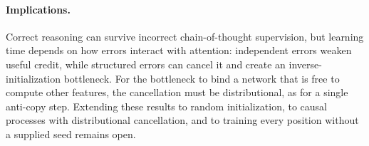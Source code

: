 \paragraph{Implications.}
\label{sec:conclusion}

Correct reasoning can survive incorrect chain-of-thought supervision, but learning time depends on how errors interact with attention:
independent errors weaken useful credit, while structured errors can cancel it and create an inverse-initialization bottleneck.
For the bottleneck to bind a network that is free to compute other features, the cancellation must be distributional, as for a single anti-copy step.
Extending these results to random initialization, to causal processes with distributional cancellation, and to training every position without a supplied seed remains open.
